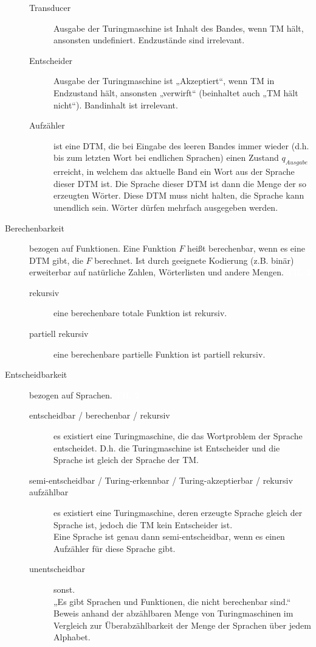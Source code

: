 \documentclass[a4paper,10pt]{article}
\newcommand{\vl}[1]{\colorbox{vl}{\textcolor{white}{\small\textbf{#1}}}}
\begin{document}
\begin{description}
\begin{description}
                \item[Transducer] Ausgabe der Turingmaschine ist Inhalt des Bandes, wenn TM hält, ansonsten undefiniert. Endzustände sind irrelevant.
                \item[Entscheider] Ausgabe der Turingmaschine ist „Akzeptiert“, wenn TM in Endzustand hält, ansonsten „verwirft“ (beinhaltet auch „TM hält nicht“). Bandinhalt ist irrelevant.
                \item[Aufzähler] ist eine DTM, die bei Eingabe des leeren Bandes immer wieder (d.h. bis zum letzten Wort bei endlichen Sprachen) einen Zustand $q_{Ausgabe}$ erreicht, in welchem das aktuelle Band ein Wort aus der Sprache dieser DTM ist. Die Sprache dieser DTM ist dann die Menge der so erzeugten Wörter. Diese DTM muss nicht halten, die Sprache kann unendlich sein. Wörter dürfen mehrfach ausgegeben werden.
            \end{description}

        \item[Berechenbarkeit] bezogen auf Funktionen. Eine Funktion $F$ heißt berechenbar, wenn es eine DTM gibt, die $F$ berechnet. Ist durch geeignete Kodierung (z.B. binär) erweiterbar auf natürliche Zahlen, Wörterlisten und andere Mengen. \vl{TIL 2}
            \begin{description}
                \item[rekursiv] eine berechenbare totale Funktion ist rekursiv.
                \item[partiell rekursiv] eine berechenbare partielle Funktion ist partiell rekursiv.
            \end{description}

        \item[Entscheidbarkeit] bezogen auf Sprachen. \vl{TIL 2}
            \begin{description}
                \item[entscheidbar / berechenbar / rekursiv] es existiert eine Turingmaschine, die das Wortproblem der Sprache entscheidet. D.h. die Turingmaschine ist Entscheider und die Sprache ist gleich der Sprache der TM.
                \item[semi-entscheidbar / Turing-erkennbar / Turing-akzeptierbar / rekursiv aufzählbar] es existiert eine Turingmaschine, deren erzeugte Sprache gleich der Sprache ist, jedoch die TM kein Entscheider ist. \\
                Eine Sprache ist genau dann semi-entscheidbar, wenn es einen Aufzähler für diese Sprache gibt.
                \item[unentscheidbar] sonst. \\
                    „Es gibt Sprachen und Funktionen, die nicht berechenbar sind.“ Beweis anhand der abzählbaren Menge von Turingmaschinen im Vergleich zur Überabzählbarkeit der Menge der Sprachen über jedem Alphabet.
            \end{description}


\end{description}
\end{document}
